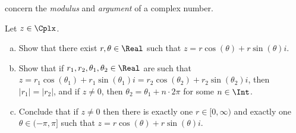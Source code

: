  concern the \textit{modulus} and \textit{argument} of a complex number.

\begin{chapex}
\label{cqModulusArgumentBegin}
Let $z \in \Cplx$.
\begin{enumerate}[(a)]
\item Show that there exist $r,\theta \in \Real$ such that $z = r\cos(\theta) + r\sin(\theta) i$.
\item Show that if $r_1,r_2,\theta_1,\theta_2 \in \Real$ are such that $z=r_1\cos(\theta_1) + r_1\sin(\theta_1) i = r_2\cos(\theta_2) + r_2\sin(\theta_2) i$, then $|r_1| = |r_2|$, and if $z \ne 0$, then $\theta_2 = \theta_1 + n \cdot 2\pi$ for some $n \in \Int$.
\item Conclude that if $z \ne 0$ then there is exactly one $r \in [0,\infty)$ and exactly one $\theta \in (-\pi,\pi]$ such that $z=r\cos(\theta) + r\sin(\theta) i$.
\end{enumerate}
\end{chapex}

